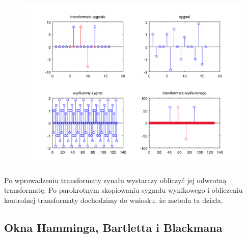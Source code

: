 \documentclass[12pt,titlepage]{report}
\begin{document}
\begin{figure}[!h]
	\centering
	\includegraphics[scale=0.7]{../cw23_output}
	\caption{}
\end{figure}
Po wprowadzeniu transformaty synału wystarczy obliczyć jej odwrotną transformatę. Po parokrotnym skopiowaniu sygnału wynikowego i obliczeniu kontrolnej transformaty dochodzimy do wniosku, że metoda ta działa.
\newpage

\subsection{Okna Hamminga, Bartletta i Blackmana}
\end{document}
